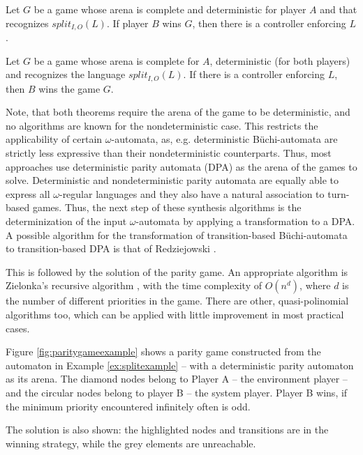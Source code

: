 \begin{theorem}
	Let $G$ be a game whose arena is complete and deterministic for player $A$ and that recognizes $split_{I,O}(L)$. If player $B$ wins $G$, then there is a controller enforcing $L$.
\end{theorem}
\begin{theorem}
	Let $G$ be a game whose arena is complete for $A$, deterministic (for both players) and recognizes the language $split_{I,O}(L)$. If there is a controller enforcing $L$, then $B$ wins the game $G$.
\end{theorem}

Note, that both theorems require the arena of the game to be deterministic, and no algorithms are known for the nondeterministic case. This restricts the applicability of certain $\omega$-automata, as, e.g. deterministic Büchi-automata are strictly less expressive than their nondeterministic counterparts. Thus, most approaches use deterministic parity automata (DPA) as the arena of the games to solve. Deterministic and nondeterministic parity automata are equally able to express all $\omega$-regular languages and they also have a natural association to turn-based games. Thus, the next step of these synthesis algorithms is the determinization of the input $\omega$-automata by applying a transformation to a DPA. A possible algorithm for the transformation of transition-based Büchi-automata to transition-based DPA is that of Redziejowski \cite{redziejowski}.

This is followed by the solution of the parity game. An appropriate algorithm is Zielonka's recursive algorithm \cite{zielonka}, with the time complexity of $O(n^d)$, where $d$ is the number of different priorities in the game. There are other, quasi-polinomial algorithms too, which can be applied with little improvement in most practical cases.

\begin{example}
	\label{ex:paritygameexample}
	Figure \ref{fig:paritygameexample} shows a parity game constructed from the automaton in Example \ref{ex:splitexample} -- with a deterministic parity automaton as its arena. The diamond nodes belong to Player A -- the environment player -- and the circular nodes belong to player B -- the system player. Player B wins, if the minimum priority encountered infinitely often is odd. 
	
	The solution is also shown: the highlighted nodes and transitions are in the winning strategy, while the grey elements are unreachable.
\end{example}


